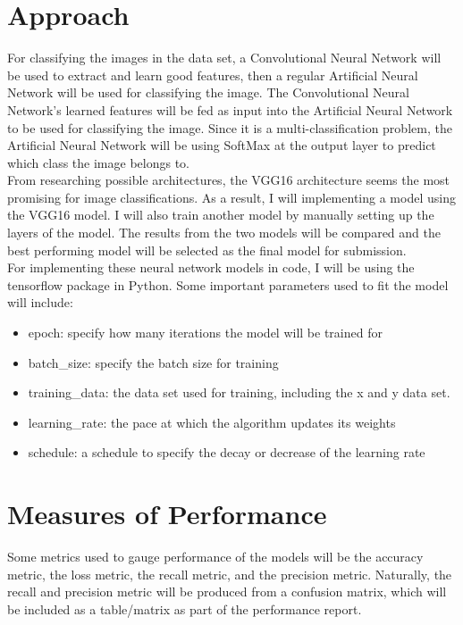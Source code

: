 \documentclass[acmtog]{acmart}
\begin{document}
	\section{Approach}
	
	For classifying the images in the data set, a Convolutional Neural Network will be used to extract and learn good features, then a regular Artificial Neural Network will be used for classifying the image. The Convolutional Neural Network's learned features will be fed as input into the Artificial Neural Network to be used for classifying the image. Since it is a multi-classification problem, the Artificial Neural Network will be using SoftMax at the output layer to predict which class the image belongs to.\\
	From researching possible architectures, the VGG16 architecture seems the most promising for image classifications. As a result, I will implementing a model using the VGG16 model. I will also train another model by manually setting up the layers of the model. The results from the two models will be compared and the best performing model will be selected as the final model for submission.\\
	For implementing these neural network models in code, I will be using the tensorflow package in Python. Some important parameters used to fit the model will include:
	\begin{itemize}
		\item epoch: specify how many iterations the model will be trained for
		\item batch\_size: specify the batch size for training
		\item training\_data: the data set used for training, including the x and y data set.
		\item learning\_rate: the pace at which the algorithm updates its weights
		\item schedule: a schedule to specify the decay or decrease of the learning rate
	\end{itemize}

	
	
	\section{Measures of Performance}
	
	Some metrics used to gauge performance of the models will be the accuracy metric, the loss metric, the recall metric, and the precision metric. Naturally, the recall and precision metric will be produced from a confusion matrix, which will be included as a table/matrix as part of the performance report.
	
	
\end{document}
